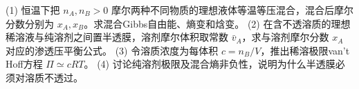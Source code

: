 (1) 恒温下把 \(n_A,n_B>0\) 摩尔两种不同物质的理想液体等温等压混合，混合后摩尔分数分别为 \(x_A,x_B\)。求混合Gibbs自由能、熵变和焓变。
(2) 在含不透溶质的理想稀溶液与纯溶剂之间置半透膜，溶剂摩尔体积取常数 \(\bar v_A\)，求与溶剂摩尔分数 \(x_A\) 对应的渗透压平衡公式。
(3) 令溶质浓度为每体积 \(c=n_B/V\)，推出稀溶极限van’t Hoff方程 \(\Pi\simeq cRT\)。
(4) 讨论纯溶剂极限及混合熵非负性，说明为什么半透膜必须对溶质不透过。

